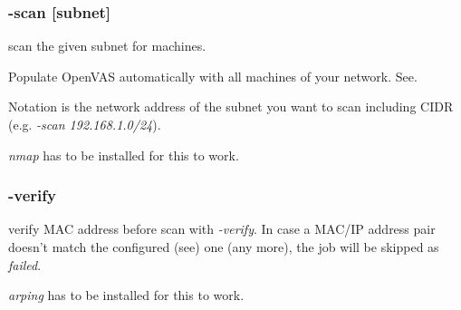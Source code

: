 \breakpoint\subsubsection*{-scan [subnet]} scan the given subnet for machines.

Populate OpenVAS automatically with all machines of your network. See.

Notation is the network address of the subnet you want to scan including CIDR (e.g. \emph{-scan 192.168.1.0/24}).

\warn \emph{nmap} has to be installed for this to work.

\breakpoint\subsubsection*{-verify}\label{sec:verifymac} verify MAC address before scan with \emph{-verify}.
In case a MAC/IP address pair doesn't match the configured (see) one (any more), the job will be skipped as \emph{failed}.

\warn \emph{arping} has to be installed for this to work.
